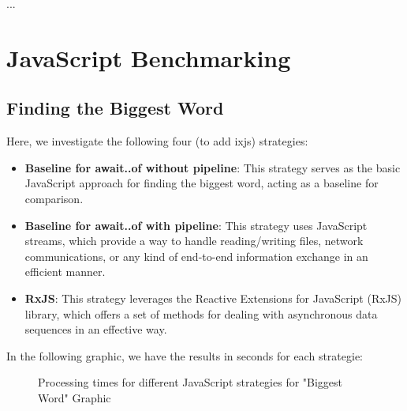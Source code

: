     \clearpage
... 


\section{JavaScript Benchmarking}
\label{sec:js_implementation}


\subsection{Finding the Biggest Word}
\label{subsec:biggest_word_js}

Here, we investigate the following four (to add ixjs) strategies:

\begin{itemize}
    \item \textbf{Baseline for await..of without pipeline}: This strategy serves as the basic JavaScript approach for finding the biggest word, acting as a baseline for comparison.
    \item \textbf{Baseline for await..of with pipeline}: This strategy uses JavaScript streams, which provide a way to handle reading/writing files, network communications, or any kind of end-to-end information exchange in an efficient manner.
    \item \textbf{RxJS}: This strategy leverages the Reactive Extensions for JavaScript (RxJS) library, which offers a set of methods for dealing with asynchronous data sequences in an effective way.
\end{itemize}


In the following graphic, we have the results in seconds for each strategie:


\begin{figure}[H]
    \raggedright
    \caption{Processing times for different JavaScript strategies for "Biggest Word" Graphic}
    \label{fig:biggest_word_processing_times_js}
\end{figure}

